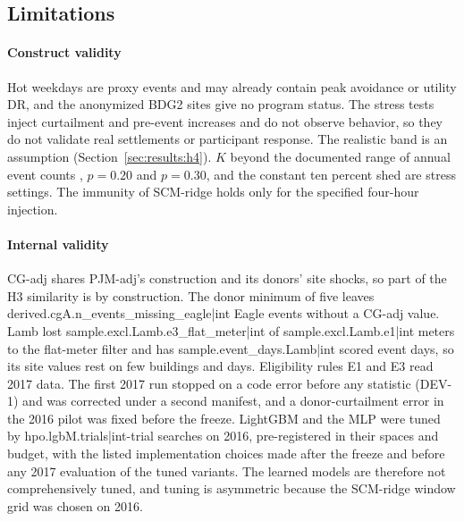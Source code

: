 \subsection{Limitations}\label{sec:discussion:limits}

\paragraph{Construct validity}Hot weekdays are proxy events and may already contain peak avoidance or utility DR, and the anonymized BDG2 sites give no program status. The stress tests inject curtailment and pre-event increases and do not observe behavior, so they do not validate real settlements or participant response. The realistic band is an assumption (Section~\ref{sec:results:h4}). $K$ beyond the documented range of annual event counts \citep{kiliccote2010,nyiso2024dr}, $p=0.20$ and $p=0.30$, and the constant ten percent shed are stress settings. The immunity of SCM-ridge holds only for the specified four-hour injection.

\paragraph{Internal validity}CG-adj shares PJM-adj's construction and its donors' site shocks, so part of the H3 similarity is by construction. The donor minimum of five leaves {{derived.cgA.n_events_missing_eagle|int}} Eagle events without a CG-adj value. Lamb lost {{sample.excl.Lamb.e3_flat_meter|int}} of {{sample.excl.Lamb.e1|int}} meters to the flat-meter filter and has {{sample.event_days.Lamb|int}} scored event days, so its site values rest on few buildings and days. Eligibility rules E1 and E3 read 2017 data. The first 2017 run stopped on a code error before any statistic (DEV-1) and was corrected under a second manifest, and a donor-curtailment error in the 2016 pilot was fixed before the freeze. LightGBM and the MLP were tuned by {{hpo.lgbM.trials|int}}-trial searches on 2016, pre-registered in their spaces and budget, with the listed implementation choices made after the freeze and before any 2017 evaluation of the tuned variants. The learned models are therefore not comprehensively tuned, and tuning is asymmetric because the SCM-ridge window grid was chosen on 2016.


